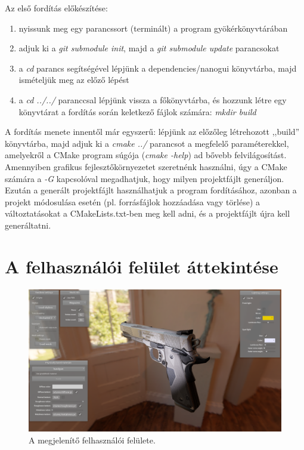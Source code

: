 \vspace{12pt}
\noindent
Az első fordítás előkészítése:

\begin{enumerate}[noitemsep]
\item nyissunk meg egy parancssort (terminált) a program gyökérkönyvtárában
\item adjuk ki a \textit{git submodule init}, majd a \textit{git submodule update} parancsokat
\item a \textit{cd} parancs segítségével lépjünk a dependencies/nanogui könyvtárba, majd ismételjük meg az előző lépést
\item a \textit{cd ../../} paranccsal lépjünk vissza a főkönyvtárba, és hozzunk létre egy könyvtárat a fordítás során keletkező fájlok számára: \textit{mkdir build}
\end{enumerate}

A fordítás menete innentől már egyszerű: lépjünk az előzőleg létrehozott ,,build'' könyvtárba, majd adjuk ki a \textit{cmake ../} parancsot a megfelelő paraméterekkel, amelyekről a CMake program súgója (\textit{cmake -\-help}) ad bővebb felvilágosítást. Amennyiben grafikus fejlesztőkörnyezetet szeretnénk használni, úgy a CMake számára a \textit{-G} kapcsolóval megadhatjuk, hogy milyen projektfájlt generáljon. Ezután a generált projektfájlt használhatjuk a program fordításához, azonban a projekt módosulása esetén (pl. forrásfájlok hozzáadása vagy törlése) a változtatásokat a CMakeLists.txt-ben meg kell adni, és a projektfájlt újra kell generáltatni.

\section{A felhasználói felület áttekintése}

\begin{figure}[!ht]
    \centering
    \includegraphics[width=1.0\textwidth]{images/screenshot.png}
    \caption{A megjelenítő felhasználói felülete.}
\end{figure}

